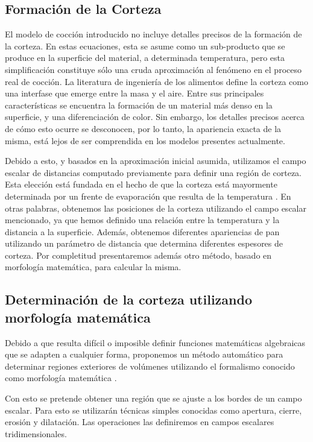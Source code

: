 \subsection{Formación de la Corteza}
El modelo de cocción introducido no incluye detalles precisos de la formación de la corteza.
En estas ecuaciones, esta se asume como un sub-producto que se produce en la superficie del material, a determinada temperatura, pero esta simplificación constituye sólo una cruda aproximación al fenómeno en el proceso real de cocción.
La literatura de ingeniería de los alimentos define la corteza como una interfase que emerge entre la masa y el aire.
Entre sus principales características se encuentra la formación de un material más denso en la superficie, y una diferenciación de color.
Sin embargo, los detalles precisos acerca de cómo esto ocurre se desconocen, por lo tanto, la apariencia exacta de la misma, está lejos de ser comprendida en los modelos presentes actualmente.

Debido a esto, y basados en la aproximación inicial asumida, utilizamos el campo escalar de distancias computado previamente para definir una región de corteza.
Esta elección está fundada en el hecho de que la corteza está mayormente determinada por un frente de evaporación que resulta de la temperatura \cite{Jefferson2007}.
En otras palabras, obtenemos las posiciones de la corteza utilizando el campo escalar mencionado, ya que hemos definido una relación entre la temperatura y la distancia a la superficie.
Además, obtenemos diferentes apariencias de pan utilizando un parámetro de distancia que determina diferentes espesores de corteza.
Por completitud presentaremos además otro método, basado en morfología matemática, para calcular la misma.

\subsection{Determinación de la corteza utilizando morfología matemática}
Debido a que resulta difícil o imposible definir funciones matemáticas algebraicas que se adapten a cualquier forma, proponemos un método automático para determinar regiones exteriores de volúmenes utilizando el formalismo conocido como morfología matemática \cite{Gonzalez2001}.

Con esto se pretende obtener una región que se ajuste a los bordes de un campo escalar.
Para esto se utilizarán técnicas simples conocidas como apertura, cierre, erosión y dilatación.
Las operaciones las definiremos en campos escalares tridimensionales.

